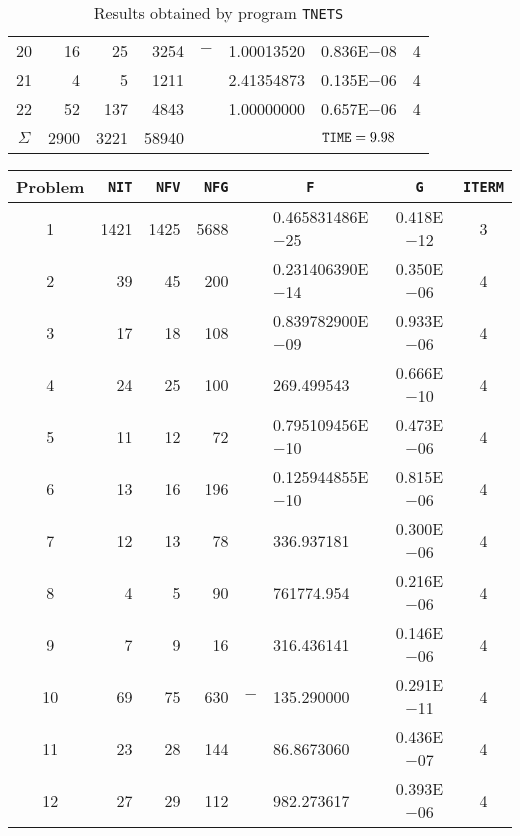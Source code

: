 \documentclass{esub2acm}
\begin{document}
\begin{table}
\begin{tabular}{c|rrrr@{}lcc}
20  &   16  &   25  &   3254    &   $-$ &   1.00013520  &   0.836E$-$08 &   4   \\
21  &   4   &   5   &   1211    &       &   2.41354873  &   0.135E$-$06 &   4   \\
22  &   52  &   137 &   4843    &       &   1.00000000  &   0.657E$-$06 &   4   \\ \hline
$\Sigma$\rule[-2pt]{0pt}{12pt}  &   2900    &   3221    &   58940   &       &       &   ${\tt TIME} = 9.98$ &       \\ \hline
\end{tabular}
\caption{Results obtained by program {\tt TNETS}}
\label{tnets}
\end{table}

\clearpage

\begin{table}
\footnotesize
\centering
\begin{tabular}{c|rrrr@{}lcc} \hline
Problem\rule[-2pt]{0pt}{12pt}  & {\tt NIT} & {\tt NFV} & {\tt NFG} & \multicolumn{2}{c}{\tt F} & {\tt G} & {\tt ITERM} \\ \hline
1\rule[-2pt]{0pt}{12pt} &   1421    &   1425    &   5688    &       &   0.465831486E$-$25   &   0.418E$-$12 &   3   \\
2   &   39  &   45  &   200 &       &   0.231406390E$-$14   &   0.350E$-$06 &   4   \\
3   &   17  &   18  &   108 &       &   0.839782900E$-$09   &   0.933E$-$06 &   4   \\
4   &   24  &   25  &   100 &       &   269.499543  &   0.666E$-$10 &   4   \\
5   &   11  &   12  &   72  &       &   0.795109456E$-$10   &   0.473E$-$06 &   4   \\
6   &   13  &   16  &   196 &       &   0.125944855E$-$10   &   0.815E$-$06 &   4   \\
7   &   12  &   13  &   78  &       &   336.937181  &   0.300E$-$06 &   4   \\
8   &   4   &   5   &   90  &       &   761774.954  &   0.216E$-$06 &   4   \\
9   &   7   &   9   &   16  &       &   316.436141  &   0.146E$-$06 &   4   \\
10  &   69  &   75  &   630 &   $-$ &   135.290000  &   0.291E$-$11 &   4   \\
11  &   23  &   28  &   144 &       &   86.8673060  &   0.436E$-$07 &   4   \\
12  &   27  &   29  &   112 &       &   982.273617  &   0.393E$-$06 &   4   \\

\end{tabular}
\end{table}
\end{document}
